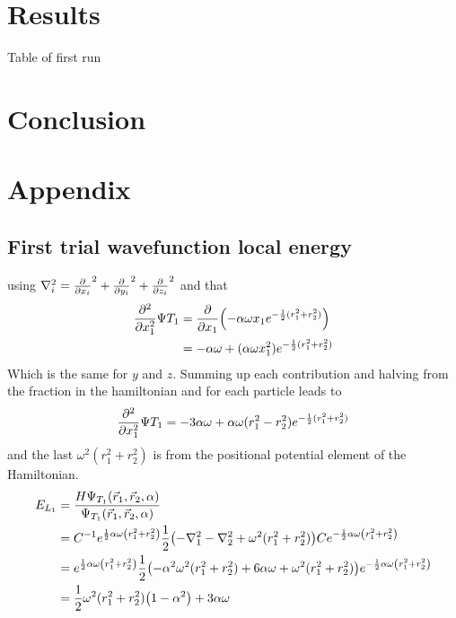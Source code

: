 \documentclass[10pt]{revtex4-1}
\begin{document}
\section{Results}


\begin{table}[h!tb]
    \centering
    \caption{Table of first run}
\end{table}

\section{Conclusion}

\section{Appendix}

\subsection{First trial wavefunction local energy}

using $\nabla_i^2 = \pdv{x_i}^2 + \pdv{y_i}^2 + \pdv{z_i}^2$ and that
\begin{align}
    \pdv[2]{x_1} \Psi{T_1} &= \pdv{x_1}\qty( -\alpha \omega x_1 e^{-\frac{1}{2}(r_1^2 + r_2^2)} )\nonumber\\
                                &= -\alpha\omega + (\alpha\omega x_1^2)e^{-\frac{1}{2}(r_1^2 + r_2^2)}
\end{align}
Which is the same for $y$ and $z$. Summing up each contribution and halving from the fraction in the hamiltonian and for each particle leads to
\begin{align}
    \pdv[2]{x_1} \Psi{T_1} = -3\alpha\omega + \alpha\omega (r_1^2 - r_2^2)e^{-\frac{1}{2}(r_1^2 + r_2^2)}
\end{align}
and the last $\omega^2 ( r_1^2 + r_2^2 )$ is from the positional potential element of the Hamiltonian.
\begin{align}
    E_{L_1} &= \frac{H \Psi_{T_1} \qty(\vec{r}_1, \vec{r}_2, \alpha )}{\Psi_{T_1} \qty(\vec{r}_1, \vec{r}_2, \alpha )}\nonumber \\
        &= C^{-1} e^{\frac{1}{2}\alpha \omega \qty(r_{1}^{2} + r_{2}^{2})} \frac{1}{2}\qty(-\nabla_1^2 -\nabla_2^2 + \omega^2(r_1^2 + r_2^2))
          C e^{-\frac{1}{2} \alpha \omega \qty(r_1^2 + r_2^2)} \nonumber \\
        &= e^{\frac{1}{2}\alpha \omega \qty(r_{1}^{2} + r_{2}^{2})}
            \frac{1}{2}\qty(-\alpha^2 \omega^2 (r_1^2 + r_2^2) + 6\alpha \omega + \omega^2 (r_1^2 + r_2^2))
            e^{-\frac{1}{2} \alpha \omega \qty(r_1^2 + r_2^2)} \nonumber \\
        &= \frac{1}{2}\omega^2 (r_1^2 + r_2^2)\qty(1 -\alpha^2 ) + 3\alpha \omega \label{eq:naiveLocalEnergyExpanded}
\end{align}
\end{document}
